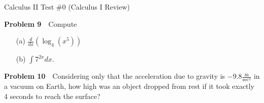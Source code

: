 \documentclass[10pt]{article}
\newcommand{\prob}[1]{\vspace{10mm} \noindent \textbf{Problem #1} \,\,}
\newcommand{\header}{
\begin{center}
Calculus II Test \#0 (Calculus I Review)
\end{center}

\vspace{2mm}

}
\begin{document}
\pagebreak

\header

\prob{9} Compute 
\begin{itemize}
\item[(a) ] $\frac{d}{dx} (\log_{ 4 } (x^5))$ 
\item[(b) ] $\int 7^{2x} dx$.
\end{itemize}

\vspace{90mm}

\prob{10} Considering only that the acceleration due to gravity is 
$-9.8 \frac{\text{m}}{\text{sec}^2}$ in a vacuum on Earth, 
how high was an object dropped from rest if it took exactly 4 seconds to reach the surface?
\end{document}
